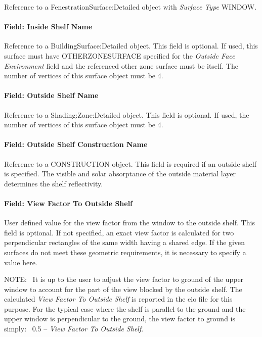 Reference to a FenestrationSurface:Detailed object with \emph{Surface Type} WINDOW.

\paragraph{Field: Inside Shelf Name}\label{field-inside-shelf-name}

Reference to a BuildingSurface:Detailed object. This field is optional. If used, this surface must have OTHERZONESURFACE specified for the \emph{Outside Face Environment} field and the referenced other zone surface must be itself. The number of vertices of this surface object must be 4.

\paragraph{Field: Outside Shelf Name}\label{field-outside-shelf-name}

Reference to a Shading:Zone:Detailed object. This field is optional. If used, the number of vertices of this surface object must be 4.

\paragraph{Field: Outside Shelf Construction Name}\label{field-outside-shelf-construction-name}

Reference to a CONSTRUCTION object. This field is required if an outside shelf is specified. The visible and solar absorptance of the outside material layer determines the shelf reflectivity.

\paragraph{Field: View Factor To Outside Shelf}\label{field-view-factor-to-outside-shelf}

User defined value for the view factor from the window to the outside shelf. This field is optional. If not specified, an exact view factor is calculated for two perpendicular rectangles of the same width having a shared edge. If the given surfaces do not meet these geometric requirements, it is necessary to specify a value here.

NOTE:~ It is up to the user to adjust the view factor to ground of the upper window to account for the part of the view blocked by the outside shelf. The calculated \emph{View Factor To Outside Shelf} is reported in the eio file for this purpose. For the typical case where the shelf is parallel to the ground and the upper window is perpendicular to the ground, the view factor to ground is simply:~ 0.5 -- \emph{View Factor To Outside Shelf}.

